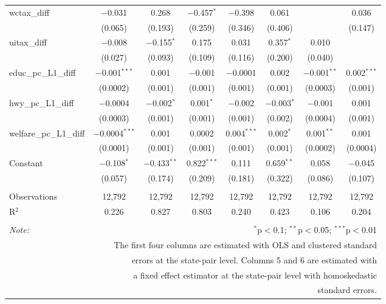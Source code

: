 \begin{table}[!htbp]
\begin{tabular}{@{\extracolsep{5pt}}lccccccc}
  wctax\_diff & $-$0.031 & 0.268 & $-$0.457$^{*}$ & $-$0.398 & 0.061 &  & 0.036 \\ 
  & (0.065) & (0.193) & (0.259) & (0.346) & (0.406) &  & (0.147) \\ 
  uitax\_diff & $-$0.008 & $-$0.155$^{*}$ & 0.175 & 0.031 & 0.357$^{*}$ & 0.010 &  \\ 
  & (0.027) & (0.093) & (0.109) & (0.116) & (0.200) & (0.040) &  \\ 
  educ\_pc\_L1\_diff & $-$0.001$^{***}$ & 0.001 & $-$0.001 & $-$0.0001 & 0.002 & $-$0.001$^{**}$ & 0.002$^{***}$ \\ 
  & (0.0002) & (0.001) & (0.001) & (0.001) & (0.001) & (0.0003) & (0.001) \\ 
  hwy\_pc\_L1\_diff & $-$0.0004 & $-$0.002$^{*}$ & 0.001$^{*}$ & $-$0.002 & $-$0.003$^{*}$ & $-$0.001 & 0.001 \\ 
  & (0.0003) & (0.001) & (0.001) & (0.001) & (0.002) & (0.0004) & (0.001) \\ 
  welfare\_pc\_L1\_diff & $-$0.0004$^{***}$ & 0.001 & 0.0002 & 0.004$^{***}$ & 0.002$^{*}$ & 0.001$^{**}$ & 0.001 \\ 
  & (0.0001) & (0.001) & (0.001) & (0.001) & (0.001) & (0.0002) & (0.0004) \\ 
  Constant & $-$0.108$^{*}$ & $-$0.433$^{**}$ & 0.822$^{***}$ & 0.111 & 0.659$^{**}$ & 0.058 & $-$0.045 \\ 
  & (0.057) & (0.174) & (0.209) & (0.181) & (0.322) & (0.086) & (0.107) \\ 
 \hline \\[-1.8ex] 
Observations & 12,792 & 12,792 & 12,792 & 12,792 & 12,792 & 12,792 & 12,792 \\ 
R$^{2}$ & 0.226 & 0.827 & 0.803 & 0.240 & 0.423 & 0.106 & 0.204 \\ 
\hline 
\hline \\[-1.8ex] 
\textit{Note:}  & \multicolumn{7}{r}{$^{*}$p$<$0.1; $^{**}$p$<$0.05; $^{***}$p$<$0.01} \\ 
 & \multicolumn{7}{r}{The first four columns are estimated with OLS and clustered standard} \\ 
 & \multicolumn{7}{r}{ errors at the state-pair level. Columns 5 and 6 are estimated with} \\ 
 & \multicolumn{7}{r}{a fixed effect estimator at the state-pair level with homoskedastic} \\ 
 & \multicolumn{7}{r}{standard errors.} \\ 
\end{tabular} 
\end{table} 
